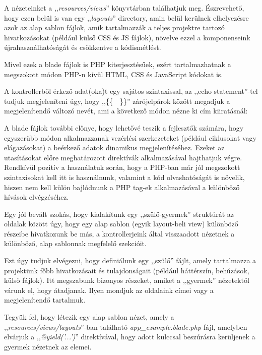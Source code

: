 \documentclass[
]{thesis-ekf}
\theoremstyle{definition}
\theoremstyle{remark}
\begin{document}
                    A nézeteinket a ,,\emph{resources/views}'' könyvtárban találhatjuk meg. Észrevehető, hogy ezen belül is van egy ,,\emph{layouts}'' directory, amin belül kerülnek elhelyezésre azok az alap sablon fájlok, amik tartalmazzák a teljes projektre tartozó hivatkozásokat (például külső CSS és JS fájlok), növelve ezzel a komponenseink újrahasználhatóságát és csökkentve a kódismétlést.

                    Mivel ezek a blade fájlok is PHP kiterjesztésűek, ezért tartalmazhatnak a megszokott módon PHP-n kívül HTML, CSS és JavaScript kódokat is.

                    A kontrollerből érkező adat(oka)t egy sajátos szintaxissal, az ,,echo statement''-tel tudjuk megjeleníteni úgy, hogy ,,\{\{~~\}\}'' zárójelpárok között megadjuk a megjelenítendő változó nevét, ami a következő módon nézne ki cím kiiratásnál:
                     

                    A blade fájlok további előnye, hogy lehetővé teszik a fejlesztők számára, hogy egyszerűbb módon alkalmazzanak vezérlési szerkezeteket (például ciklusokat vagy elágazásokat) a beérkező adatok dinamikus megjelenítéséhez. Ezeket az utasításokat előre meghatározott direktívák\cite{Laravel-BladeDirectives} alkalmazásával hajthatjuk végre. Rendkívül pozitív a használatuk során, hogy a PHP-ban már jól megszokott szintaxisokat kell itt is használnunk, valamint a kód olvashatóságát is növelik, hiszen nem kell külön bajlódnunk a PHP tag-ek alkalmazásával a különböző hívások elvégzéséhez.
                    

                    Egy jól bevált szokás, hogy kialakítunk egy ,,szülő-gyermek'' struktúrát\cite{Laravel-BladeLayoutInheritance} az oldalak között úgy, hogy egy alap sablon (egyik layout-beli view) különböző részeibe hivatkozunk be más, a kontrollerjeink által visszaadott nézetnek a különböző, alap sablonnak megfelelő szekcióit.

                    Ezt úgy tudjuk elvégezni, hogy definiálunk egy ,,szülő'' fájlt, amely tartalmazza a projektünk főbb hivatkozásait és tulajdonságait (például háttérszín, behúzások, külső fájlok). Itt megszabunk bizonyos részeket, amiket a ,,gyermek'' nézetektől várunk el, hogy átadjanak. Ilyen mondjuk az oldalaink címei vagy a megjelenítendő tartalmuk.

                    Tegyük fel, hogy létezik egy alap sablon nézet, amely a ,,\emph{resources/views/layouts}''-ban található \emph{app\_example.blade.php} fájl, amelyben elvárjuk a ,,\emph{@yield('...')}'' direktívával, hogy adott kulccsal beszúrásra kerüljenek a gyermek nézetnek az elemei.
                    
\end{document}
